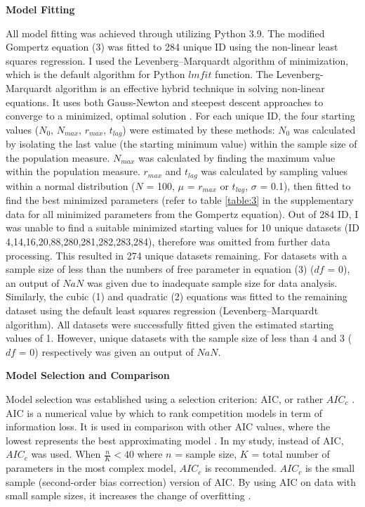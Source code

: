 \documentclass[11pt]{article}
\begin{document}
\noindent\textbf{Model Fitting}

All model fitting was achieved through utilizing Python 3.9. The modified Gompertz equation (3) was fitted to 284 unique ID 
using the non-linear least squares regression. I used the Levenberg–Marquardt algorithm of minimization, which is the default 
algorithm for Python $lmfit$ function.  The Levenberg-Marquardt algorithm is an effective 
hybrid technique in solving non-linear equations. It uses both Gauss-Newton and steepest descent approaches to converge 
to a minimized, optimal solution \cite{wilson_chapter_2013}. For each unique ID, the four starting values ($N_{0}$, $N_{max}$, $r_{max}$, $t_{lag}$)
were estimated by these methods: $N_{0}$ was calculated by isolating the last value (the starting minimum value) within the sample size of 
the population measure. $N_{max}$ was calculated by finding the maximum value within the population measure. $r_{max}$ and $t_{lag}$
was calculated by sampling values within a normal distribution ($N$ = 100, $\mu$ = $r_{max}$ or $t_{lag}$, $\sigma$ = 0.1), then fitted  
to find the best minimized parameters (refer to table \ref{table:3} in the supplementary data for all minimized parameters from the Gompertz equation). 
Out of 284 ID, I was unable to find a suitable minimized starting values for 10 unique datasets
(ID 4,14,16,20,88,280,281,282,283,284), therefore was omitted from further data processing. This resulted in 274 unique datasets remaining. 
For datasets with a sample size of less than the numbers of free parameter in equation (3) ($df$ = 0), an output of $NaN$ was given due to 
inadequate sample size for data analysis. Similarly, the cubic (1) and quadratic (2) equations was fitted to the remaining dataset 
using the default least squares regression (Levenberg–Marquardt algorithm). All datasets were successfully fitted given the 
estimated starting values of 1. However, unique datasets with the sample size of less than 4 and 3 ($df$ = 0) respectively was given an output of $NaN$. 

\noindent\textbf{Model Selection and Comparison}

Model selection was established using a selection criterion: AIC, or rather $AIC_{c}$ \cite{burnham_multimodel_2004}. AIC is a numerical value by which to 
rank competition models in term of information loss. It is used in comparison with other AIC values, where the lowest 
represents the best approximating model \cite{symonds_brief_2011}. In my study, instead of AIC, $AIC_{c}$ was used. When \(\frac{n}{K}<40\) where $n$ = sample size,
$K$ = total number of parameters in the most complex model, $AIC_{c}$ is recommended. $AIC_{c}$ is the small 
sample (second-order bias correction) version of AIC. By using AIC on data with small sample sizes, it increases the change 
of overfitting \cite{burnham_multimodel_2004}.
\end{document}
